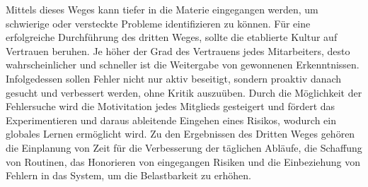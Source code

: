 Mittels dieses Weges kann tiefer in die Materie eingegangen werden, um schwierige oder versteckte Probleme identifizieren zu können. Für eine erfolgreiche Durchführung des dritten Weges, sollte die etablierte Kultur auf Vertrauen beruhen. Je höher der Grad des Vertrauens jedes Mitarbeiters, desto wahrscheinlicher und schneller ist die Weitergabe von gewonnenen Erkenntnissen. \cite[S. 357]{kim_phoenix_2014} Infolgedessen sollen Fehler nicht nur aktiv beseitigt, sondern proaktiv danach gesucht und verbessert werden, ohne Kritik auszuüben. \cite[S. 255]{tiemeyer_handbuch_2021} Durch die Möglichkeit der Fehlersuche wird die Motivitation jedes Mitglieds gesteigert und fördert das Experimentieren und daraus ableitende Eingehen eines Risikos, wodurch ein globales Lernen ermöglicht wird. Zu den Ergebnissen des Dritten Weges gehören die Einplanung von Zeit für die Verbesserung der täglichen Abläufe, die Schaffung von Routinen, das Honorieren von eingegangen Risiken und die Einbeziehung von Fehlern in das System, um die Belastbarkeit zu erhöhen.


